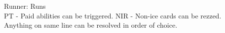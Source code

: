 \documentclass[12pt]{article}
\newenvironment{itemizeCustom}
{\begin{itemize}
  \setlength{\itemsep}{1pt}
  \setlength{\parskip}{0pt}
  \setlength{\parsep}{0pt}}
{\end{itemize}}
\begin{document}
\begin{multicols*}{2}
Runner: Runs
\\PT - Paid abilities can be triggered. NIR - Non-ice cards can be rezzed.\\
Anything on same line can be resolved in order of choice.

\end{multicols*}
\end{document}
